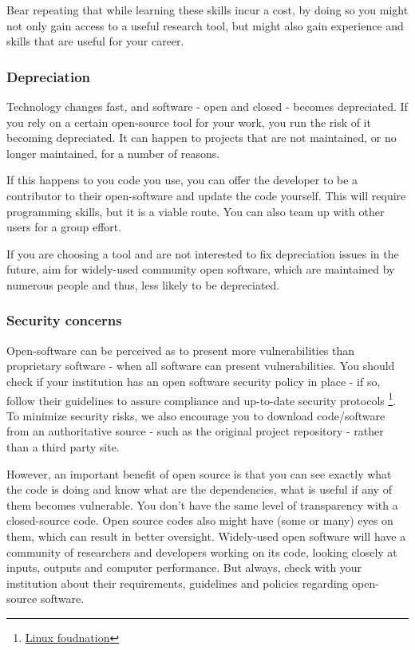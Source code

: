 \documentclass[
  letterpaper,
  DIV=11,
  numbers=noendperiod]{scrreport}
\begin{document}
Bear repeating that while learning these skills incur a cost, by doing
so you might not only gain access to a useful research tool, but might
also gain experience and skills that are useful for your career.

\hypertarget{depreciation}{%
\subsubsection{Depreciation}\label{depreciation}}

Technology changes fast, and software - open and closed - becomes
depreciated. If you rely on a certain open-source tool for your work,
you run the risk of it becoming depreciated. It can happen to projects
that are not maintained, or no longer maintained, for a number of
reasons.

If this happens to you code you use, you can offer the developer to be a
contributor to their open-software and update the code yourself. This
will require programming skills, but it is a viable route. You can also
team up with other users for a group effort.

If you are choosing a tool and are not interested to fix depreciation
issues in the future, aim for widely-used community open software, which
are maintained by numerous people and thus, less likely to be
depreciated.

\hypertarget{security-concerns}{%
\subsubsection{Security concerns}\label{security-concerns}}

Open-software can be perceived as to present more vulnerabilities than
proprietary software - when all software can present vulnerabilities.
You should check if your institution has an open software security
policy in place - if so, follow their guidelines to assure compliance
and up-to-date security protocols \footnote{\href{https://www.linuxfoundation.org/}{Linux
  foudnation}}. To minimize security risks, we also encourage you to
download code/software from an authoritative source - such as the
original project repository - rather than a third party site.

However, an important benefit of open source is that you can see exactly
what the code is doing and know what are the dependencies, what is
useful if any of them becomes vulnerable. You don't have the same level
of transparency with a closed-source code. Open source codes also might
have (some or many) eyes on them, which can result in better oversight.
Widely-used open software will have a community of researchers and
developers working on its code, looking closely at inputs, outputs and
computer performance. But always, check with your institution about
their requirements, guidelines and policies regarding open-source
software.
\end{document}
